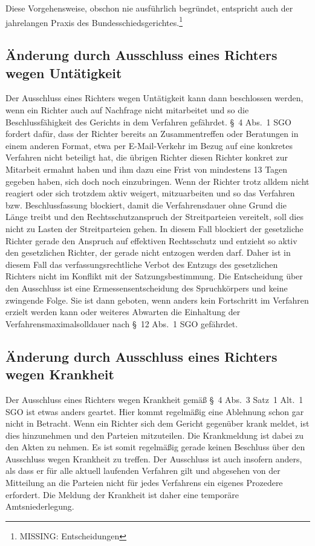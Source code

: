 Diese Vorgehensweise, obschon nie ausführlich begründet, entspricht auch der jahrelangen Praxis des Bundesschiedsgerichtes.\footnote{MISSING: Entscheidungen}

\subsection{Änderung durch Ausschluss eines Richters wegen Untätigkeit}
\label{Zusammensetzung:Spruchkoerper:Untaetigkeit}
Der Ausschluss eines Richters wegen Untätigkeit kann dann beschlossen werden, wenn ein Richter auch auf Nachfrage nicht mitarbeitet und so die Beschlussfähigkeit des Gerichts in dem Verfahren gefährdet.
\S~4 Abs.~1 SGO fordert dafür, dass der Richter bereits an Zusammentreffen oder Beratungen in einem anderen Format, etwa per E-Mail-Verkehr im Bezug auf eine konkretes Verfahren nicht beteiligt hat, die übrigen Richter diesen Richter konkret zur Mitarbeit ermahnt haben und ihm dazu eine Frist von mindestens 13 Tagen gegeben haben, sich doch noch einzubringen.
Wenn der Richter trotz alldem nicht reagiert oder sich trotzdem aktiv weigert, mitzuarbeiten und so das Verfahren bzw. Beschlussfassung blockiert, damit die Verfahrensdauer ohne Grund die Länge treibt und den Rechtsschutzanspruch der Streitparteien vereitelt, soll dies nicht zu Lasten der Streitparteien gehen.
In diesem Fall blockiert der gesetzliche Richter gerade den Anspruch auf effektiven Rechtsschutz und entzieht so aktiv den gesetzlichen Richter, der gerade nicht entzogen werden darf.
Daher ist in diesem Fall das verfassungsrechtliche Verbot des Entzugs des gesetzlichen Richters nicht im Konflikt mit der Satzungsbestimmung.
Die Entscheidung über den Ausschluss ist eine Ermessensentscheidung des Spruchkörpers und keine zwingende Folge.
Sie ist dann geboten, wenn anders kein Fortschritt im Verfahren erzielt werden kann oder weiteres Abwarten die Einhaltung der Verfahrensmaximalsolldauer nach \S~12 Abs.~1 SGO gefährdet.

\subsection{Änderung durch Ausschluss eines Richters wegen Krankheit}
\label{Zusammensetzung:Spruchkoerper:Krankheit}
Der Ausschluss eines Richters wegen Krankheit gemäß \S~4 Abs.~3 Satz~1 Alt.~1 SGO ist etwas anders geartet.
Hier kommt regelmäßig eine Ablehnung schon gar nicht in Betracht.
Wenn ein Richter sich dem Gericht gegenüber krank meldet, ist dies hinzunehmen und den Parteien mitzuteilen.
Die Krankmeldung ist dabei zu den Akten zu nehmen.
Es ist somit regelmäßig gerade keinen Beschluss über den Ausschluss wegen Krankheit zu treffen.
Der Ausschluss ist auch insofern anders, als dass er für alle aktuell laufenden Verfahren gilt und abgesehen von der Mitteilung an die Parteien nicht für jedes Verfahrens ein eigenes Prozedere erfordert.
Die Meldung der Krankheit ist daher eine temporäre Amtsniederlegung.

